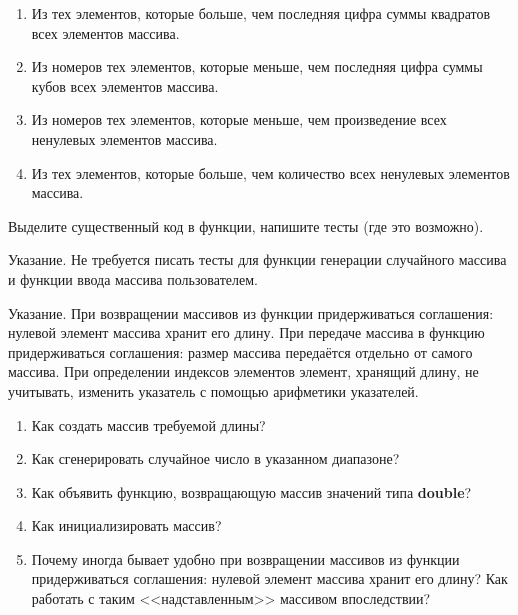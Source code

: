 \begin{enumerate}
	\item
		Из тех элементов, которые больше, чем последняя цифра суммы квадратов всех элементов массива.

	\item
		Из номеров тех элементов, которые меньше, чем последняя цифра суммы кубов всех элементов массива.

	\item
		Из номеров тех элементов, которые меньше, чем произведение всех ненулевых элементов массива.

	\item
		Из тех элементов, которые больше, чем количество всех ненулевых элементов массива.

\end{enumerate}


\labtask

Выделите существенный код в функции, напишите тесты (где это возможно).

Указание. Не требуется писать тесты для функции генерации случайного массива и функции ввода массива пользователем. 

Указание. При возвращении массивов из функции придерживаться соглашения: нулевой элемент массива хранит его длину.
При передаче массива в функцию придерживаться соглашения: размер массива передаётся отдельно от самого массива.
При определении индексов элементов элемент, хранящий длину, не учитывать, изменить указатель с помощью арифметики указателей.

\labworkquestions

\begin{enumerate}

	\item
		Как создать массив требуемой длины?
	\item
		Как сгенерировать случайное число в указанном диапазоне?
	\item
		Как объявить функцию, возвращающую массив значений типа \textbf{double}?
	\item
		Как инициализировать массив?
	\item
		Почему иногда бывает удобно при возвращении массивов из функции придерживаться соглашения: нулевой элемент массива хранит его длину?
		Как работать с таким <<надставленным>> массивом впоследствии?
\end{enumerate}



